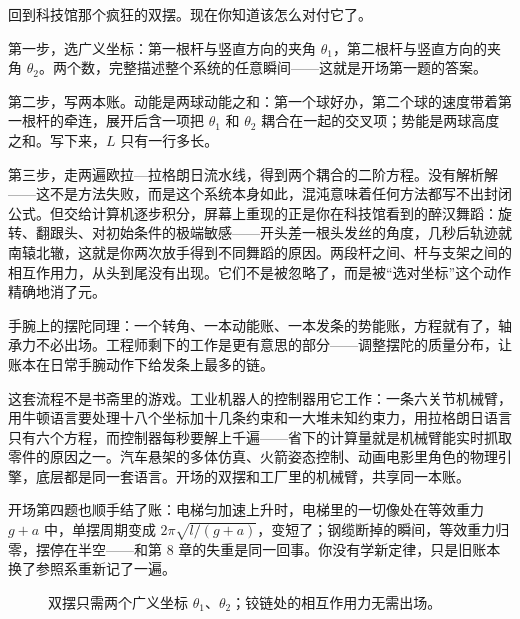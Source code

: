 
\begin{mainline}
回到科技馆那个疯狂的双摆。现在你知道该怎么对付它了。

第一步，选广义坐标：第一根杆与竖直方向的夹角 \(\theta_1\)，第二根杆与竖直方向的夹角 \(\theta_2\)。两个数，完整描述整个系统的任意瞬间——这就是开场第一题的答案。

第二步，写两本账。动能是两球动能之和：第一个球好办，第二个球的速度带着第一根杆的牵连，展开后含一项把 \(\theta_1\) 和 \(\theta_2\) 耦合在一起的交叉项；势能是两球高度之和。写下来，\(L\) 只有一行多长。

第三步，走两遍欧拉—拉格朗日流水线，得到两个耦合的二阶方程。没有解析解——这不是方法失败，而是这个系统本身如此，混沌意味着任何方法都写不出封闭公式。但交给计算机逐步积分，屏幕上重现的正是你在科技馆看到的醉汉舞蹈：旋转、翻跟头、对初始条件的极端敏感——开头差一根头发丝的角度，几秒后轨迹就南辕北辙，这就是你两次放手得到不同舞蹈的原因。两段杆之间、杆与支架之间的相互作用力，从头到尾没有出现。它们不是被忽略了，而是被“选对坐标”这个动作精确地消了元。

手腕上的摆陀同理：一个转角、一本动能账、一本发条的势能账，方程就有了，轴承力不必出场。工程师剩下的工作是更有意思的部分——调整摆陀的质量分布，让账本在日常手腕动作下给发条上最多的链。

这套流程不是书斋里的游戏。工业机器人的控制器用它工作：一条六关节机械臂，用牛顿语言要处理十八个坐标加十几条约束和一大堆未知约束力，用拉格朗日语言只有六个方程，而控制器每秒要解上千遍——省下的计算量就是机械臂能实时抓取零件的原因之一。汽车悬架的多体仿真、火箭姿态控制、动画电影里角色的物理引擎，底层都是同一套语言。开场的双摆和工厂里的机械臂，共享同一本账。

开场第四题也顺手结了账：电梯匀加速上升时，电梯里的一切像处在等效重力 \(g+a\) 中，单摆周期变成 \(2\pi\sqrt{l/(g+a)}\)，变短了；钢缆断掉的瞬间，等效重力归零，摆停在半空——和第 8 章的失重是同一回事。你没有学新定律，只是旧账本换了参照系重新记了一遍。
\end{mainline}

\begin{figure}[htbp]
\centering
{}
\caption{双摆只需两个广义坐标 \(\theta_1\)、\(\theta_2\)；铰链处的相互作用力无需出场。}
\end{figure}

